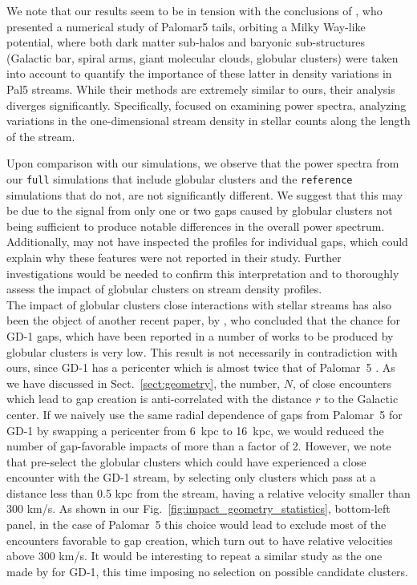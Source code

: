 \documentclass[draft]{aa}
\begin{document}
  We note that our results seem to be in tension with the conclusions of \citet{2019MNRAS.484.2009B}, who presented a numerical study of Palomar5 tails, orbiting a Milky Way-like potential, where both dark matter sub-halos and baryonic sub-structures (Galactic bar, spiral arms, giant molecular clouds, globular clusters) were taken into account to quantify the importance of these latter in density variations in Pal5 streams. While their methods are extremely similar to ours, their analysis diverges significantly. Specifically, \citet{2019MNRAS.484.2009B} focused on examining power spectra, analyzing variations in the one-dimensional stream density in stellar counts along the length of the stream. 

  Upon comparison with our simulations, we observe that the power spectra from our \texttt{full} simulations that include globular clusters and the \texttt{reference} simulations that do not, are not significantly different. We suggest that this may be due to the signal from only one or two gaps caused by globular clusters not being sufficient to produce notable differences in the overall power spectrum. Additionally, \citet{2019MNRAS.484.2009B} may not have inspected the profiles for individual gaps, which could explain why these features were not reported in their study. Further investigations would be needed to confirm this interpretation and to thoroughly assess the impact of globular clusters on stream density profiles. \\

  The impact of globular clusters close interactions with stellar streams has also been the object of another recent paper, by \citet{2022ApJ...941..129D}, who concluded that the chance for GD-1 gaps, which have been reported in a number of works \citep[see, for example, ][]{2019ApJ...880...38B,2018MNRAS.477.1893D,2020AAS...23533607D} to be produced by globular clusters is very low. This result is not necessarily in contradiction with ours, since GD-1 has a pericenter which is almost twice that of Palomar~5 \citep[see, for example][]{2019MNRAS.486.2995M}. As we have discussed in Sect.~\ref{sect:geometry}, the number, $N$, of close encounters which lead to gap creation is anti-correlated with the distance $r$ to the Galactic center. If we naively use the same radial dependence of gaps from Palomar~5 for GD-1 by swapping a pericenter from 6~kpc to 16~kpc, we would reduced the number of gap-favorable impacts of more than a factor of 2. However, we note that \citet{2022ApJ...941..129D} pre-select the globular clusters which could have experienced a close encounter with the GD-1 stream, by selecting only clusters which pass at a distance less than 0.5 kpc from the stream, having a relative velocity smaller than  300 km/s. As shown in our Fig.~\ref{fig:impact_geometry_statistics}, bottom-left panel, in the case of Palomar~5 this choice would lead to exclude most of the encounters favorable to gap creation, which turn out to have relative velocities above 300 km/s. It would be interesting to repeat a similar study as the one made by \citet{2022ApJ...941..129D} for GD-1, this time imposing no selection on possible candidate clusters.\\
  
\end{document}
